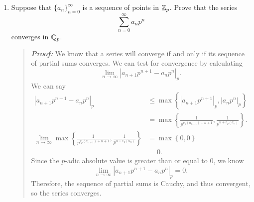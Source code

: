 \documentclass{hw}
\begin{document}
\begin{enumerate}
	\item Suppose that $\{ a_{n} \}_{n=0}^{\infty}$ is a sequence of points in $\mathbb{Z}_{p}$. Prove that the series
	      \[
	      	\sum_{n=0}^{\infty}a_{n}p^{n}
	      \]
	      converges in $\mathbb{Q}_{p}$.
	      \begin{quote}
	      	\textit{\textbf{Proof:}} We know that a series will converge if and only if its sequence of partial sums converges. We can test for convergence by calculating
	      	\[
	      		\lim_{n\to\infty}\left|a_{n+1}p^{n+1}-a_{n}p^{n}\right|_{p}.
	      	\]
	      	We can say
	      	\begin{align*}
	      		\left|a_{n+1}p^{n+1}-a_{n}p^{n}\right|_{p} & \leq \max\left\{%
	      		\left|a_{n+1}p^{n+1}\right|_{p},\left|a_{n}p^{n}\right|_{p}%
	      		\right\}\\
	      		                                           & = \max\left\{%
	      		\frac{1}{p^{v_{p}(a_{n+1}) + n + 1}}, \frac{1}{p^{n+v_{p}(a_{n})}}%
	      		\right\}.\\
	      		\lim_{n\to\infty}\max\left\{%
	      		\frac{1}{p^{v_{p}(a_{n+1}) + n + 1}}, \frac{1}{p^{n+v_{p}(a_{n})}}%
	      		\right\}                                   & = \max\left\{0,0\right\} \\
	      		                                           & = 0.
	      	\end{align*}
	      	Since the $p$-adic absolute value is greater than or equal to 0, we know
	      	\[
	      		\lim_{n\to\infty}\left|a_{n+1}p^{n+1}-a_{n}p^{n}\right|_{p} = 0.
	      	\]
	      	Therefore, the sequence of partial sums is Cauchy, and thus convergent, so the series converges.
	      \end{quote}


\end{enumerate}
\end{document}
